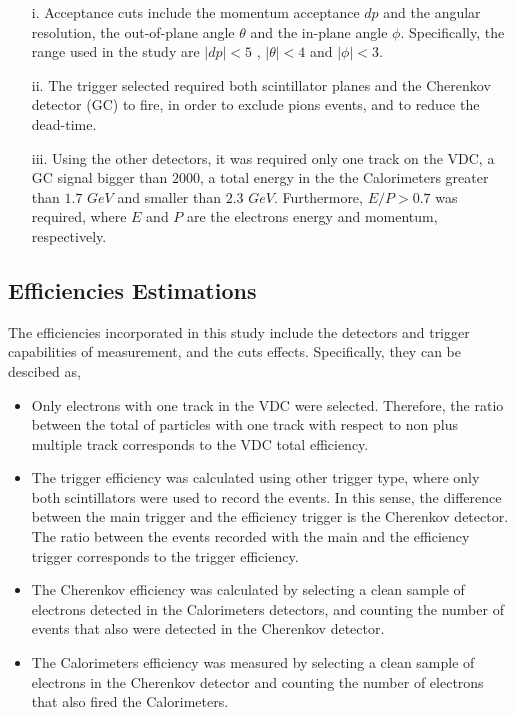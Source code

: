 \documentclass[final,5p,times,twocolumn]{elsarticle}
\begin{document}
\begin{itemize}
\item[i.]Acceptance cuts include the momentum acceptance $dp$ and the angular resolution, the out-of-plane angle $\theta $ and the in-plane angle $\phi $. Specifically, the range used in the study 
are $|dp| < 5 $ ,  $|\theta| < 4  $ and $|\phi| < 3 $.

\item[ii.] The trigger selected required both scintillator planes and the Cherenkov detector (GC) to fire, in order to exclude pions events, and to reduce the dead-time.

\item[iii.]Using the other detectors, it was required only one track on the VDC, a GC signal bigger than $2000$, a total energy in the the Calorimeters greater than $1.7$ $GeV$  and smaller than $2.3$ $GeV$. Furthermore,  $E/P>0.7$ was required, where $E$ and $P$ are the electrons energy and momentum, respectively.
\end{itemize}

\subsection{Efficiencies Estimations } 

The efficiencies incorporated in this study include the detectors and trigger capabilities of measurement, and the cuts effects. Specifically, they can be descibed as, 

\begin{itemize}
\item Only electrons with one track in the VDC were selected. Therefore, the ratio between the total of particles with one track with respect to non plus multiple track corresponds to the VDC total efficiency. 
\item The trigger efficiency was calculated using other trigger type, where only both scintillators were used to record the events. In this sense, the difference between the main trigger and the efficiency trigger is the Cherenkov detector.  The ratio between the events recorded with the main and the efficiency trigger corresponds to the trigger efficiency.
\item The Cherenkov efficiency was calculated by selecting a clean sample of electrons detected in the Calorimeters detectors, and counting the number of events that also were detected in the Cherenkov detector.

\item The Calorimeters efficiency was measured by selecting a clean sample of electrons in the Cherenkov detector and counting the number of electrons that also fired the Calorimeters.

\end{itemize}
\end{document}
